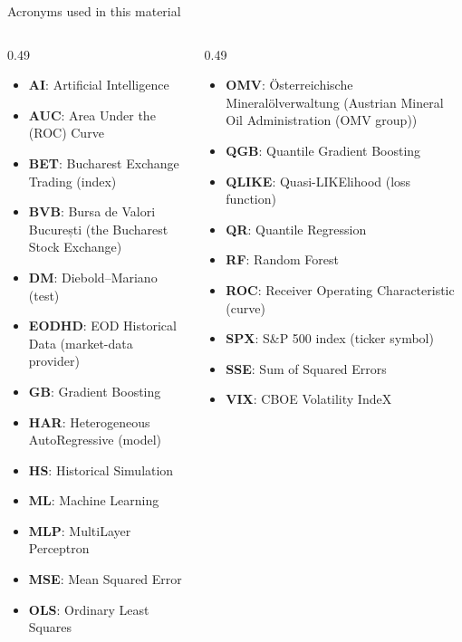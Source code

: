 {
\begin{frame}[noframenumbering]
    \titlepage
\end{frame}
}
\begin{frame}{Acronyms used in this material}
\begin{columns}[T]
\begin{column}{0.49\textwidth}
\begin{itemize}\setlength{\itemsep}{0pt}
    \item \textbf{AI}: Artificial Intelligence
    \item \textbf{AUC}: Area Under the (ROC) Curve
    \item \textbf{BET}: Bucharest Exchange Trading (index)
    \item \textbf{BVB}: Bursa de Valori București (the Bucharest Stock Exchange)
    \item \textbf{DM}: Diebold–Mariano (test)
    \item \textbf{EODHD}: EOD Historical Data (market-data provider)
    \item \textbf{GB}: Gradient Boosting
    \item \textbf{HAR}: Heterogeneous AutoRegressive (model)
    \item \textbf{HS}: Historical Simulation
    \item \textbf{ML}: Machine Learning
    \item \textbf{MLP}: MultiLayer Perceptron
    \item \textbf{MSE}: Mean Squared Error
    \item \textbf{OLS}: Ordinary Least Squares
\end{itemize}
\end{column}
\begin{column}{0.49\textwidth}
\begin{itemize}\setlength{\itemsep}{0pt}
    \item \textbf{OMV}: Österreichische Mineralölverwaltung (Austrian Mineral Oil Administration (OMV group))
    \item \textbf{QGB}: Quantile Gradient Boosting
    \item \textbf{QLIKE}: Quasi-LIKElihood (loss function)
    \item \textbf{QR}: Quantile Regression
    \item \textbf{RF}: Random Forest
    \item \textbf{ROC}: Receiver Operating Characteristic (curve)
    \item \textbf{SPX}: S\&P 500 index (ticker symbol)
    \item \textbf{SSE}: Sum of Squared Errors
    \item \textbf{VIX}: CBOE Volatility IndeX
\end{itemize}
\end{column}
\end{columns}
\end{frame}

